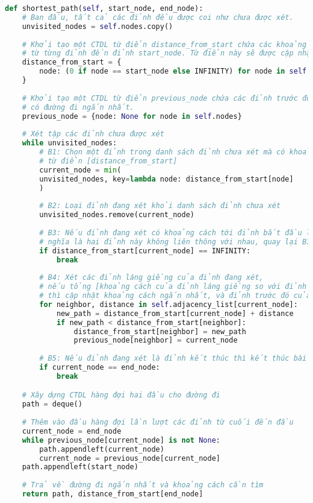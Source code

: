 \begin{lstlisting}[language=Python, caption=Thuật toán Dijkstra]
def shortest_path(self, start_node, end_node):
	# Ban đầu, tất cả các đỉnh đều được coi như chưa được xét.
	unvisited_nodes = self.nodes.copy()
	
	# Khởi tạo một CTDL từ điển distance_from_start chứa các khoảng cách ban đầu (INFINITY) 
	# từ từng đỉnh đến đỉnh start_node. Từ điển này sẽ được cập nhật khi tìm đường ngắn nhất.
	distance_from_start = {
		node: (0 if node == start_node else INFINITY) for node in self.nodes
	}
	
	# Khởi tạo một CTDL từ điển previous_node chứa các đỉnh trước đó khi xét tới từng điểm
	# có đường đi ngắn nhất.
	previous_node = {node: None for node in self.nodes}
	
	# Xét tập các đỉnh chưa được xét
	while unvisited_nodes:
		# B1: Chọn một đỉnh trong danh sách đỉnh chưa xét mà có khoảng cách ngắn nhất trong 
		# từ điển [distance_from_start]
		current_node = min(
		unvisited_nodes, key=lambda node: distance_from_start[node]
		)
		
		# B2: Loại đỉnh đang xét khỏi danh sách đỉnh chưa xét
		unvisited_nodes.remove(current_node)
		
		# B3: Nếu đỉnh đang xét có khoảng cách tới đỉnh bắt đầu là INFINITY, 
		# nghĩa là hai đỉnh này không liên thông với nhau, quay lại B1
		if distance_from_start[current_node] == INFINITY:
			break
		
		# B4: Xét các đỉnh láng giềng của đỉnh đang xét, 
		# nếu tổng [khoảng cách của đỉnh láng giềng so với đỉnh đang xét] và [khoảng cách đỉnh bắt đầu so với đỉnh đang xét] bé hơn khoảng cách [đỉnh bắt đầu so với đỉnh láng giềng]
		# thì cập nhật khoảng cách ngắn nhất, và đỉnh trước đó của láng giềng là đỉnh đang xét
		for neighbor, distance in self.adjacency_list[current_node]:
			new_path = distance_from_start[current_node] + distance
			if new_path < distance_from_start[neighbor]:
				distance_from_start[neighbor] = new_path
				previous_node[neighbor] = current_node
		
		# B5: Nếu đỉnh đang xét là đỉnh kết thúc thì kết thúc bài toán.
		if current_node == end_node:
			break

	# Xây dựng CTDL hàng đợi hai đầu cho đường đi
	path = deque()
	
	# Thêm vào đầu hàng đợi lần lượt các đỉnh từ cuối đến đầu
	current_node = end_node
	while previous_node[current_node] is not None:
		path.appendleft(current_node)
		current_node = previous_node[current_node]
	path.appendleft(start_node)
	
	# Trả về đường đi ngắn nhất và khoảng cách cần tìm
	return path, distance_from_start[end_node]
\end{lstlisting}
